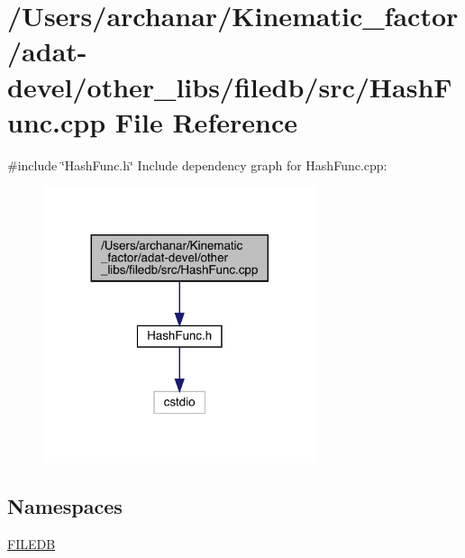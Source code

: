 \hypertarget{adat-devel_2other__libs_2filedb_2src_2HashFunc_8cpp}{}\section{/\+Users/archanar/\+Kinematic\+\_\+factor/adat-\/devel/other\+\_\+libs/filedb/src/\+Hash\+Func.cpp File Reference}
\label{adat-devel_2other__libs_2filedb_2src_2HashFunc_8cpp}
{\ttfamily \#include \char`\"{}Hash\+Func.\+h\char`\"{}}\newline
Include dependency graph for Hash\+Func.\+cpp\+:
\nopagebreak
\begin{figure}[H]
\begin{center}
\leavevmode
\includegraphics[width=227pt]{df/d29/adat-devel_2other__libs_2filedb_2src_2HashFunc_8cpp__incl}
\end{center}
\end{figure}
\subsection*{Namespaces}
\begin{DoxyCompactItemize}
\item 
 \mbox{\hyperlink{namespaceFILEDB}{F\+I\+L\+E\+DB}}
\end{DoxyCompactItemize}
